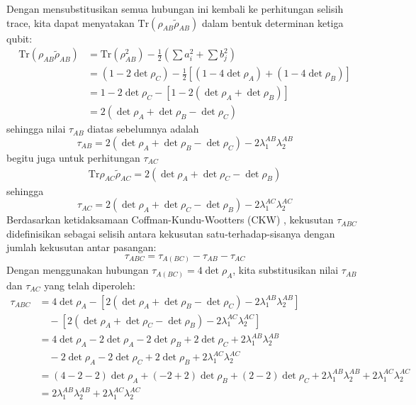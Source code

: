 Dengan mensubstitusikan semua hubungan ini kembali ke perhitungan selisih trace, kita dapat menyatakan $\text{Tr}(\rho_{AB} \tilde{\rho}_{AB})$ dalam bentuk determinan ketiga qubit:
\begin{align*}
	\text{Tr}(\rho_{AB} \tilde{\rho}_{AB}) &= \text{Tr}(\rho_{AB}^2) - \frac{1}{2} \left( \sum a_i^2 + \sum b_j^2 \right) \\
	&= (1 - 2\det \rho_C) - \frac{1}{2} [ (1 - 4\det \rho_A) + (1 - 4\det \rho_B) ] \\
	&= 1 - 2\det \rho_C - [ 1 - 2(\det \rho_A + \det \rho_B) ] \\
	&= 2 ( \det \rho_A + \det \rho_B - \det \rho_C )
\end{align*}
sehingga nilai $\tau_{AB}$ diatas sebelumnya adalah
\begin{equation*}
	\tau_{AB} = 2 ( \det \rho_A + \det \rho_B - \det \rho_C )-2\lambda_1^{AB}\lambda_2^{AB}
\end{equation*}
begitu juga untuk perhitungan $\tau_{AC}$ 
\begin{align*}
	\text{Tr}\rho_{AC}\tilde{\rho}_{AC} = 2( \det \rho_A + \det \rho_C - \det \rho_B)
\end{align*}
sehingga 
\begin{equation*}
	\tau_{AC} = 2( \det \rho_A + \det \rho_C - \det \rho_B) - 2\lambda_1^{AC}\lambda_2^{AC}
\end{equation*}
Berdasarkan ketidaksamaan Coffman-Kundu-Wootters (CKW) \cite{coffman2000distributed}, kekusutan $\tau_{ABC}$ didefinisikan sebagai selisih antara kekusutan satu-terhadap-sisanya dengan jumlah kekusutan antar pasangan:
\begin{equation*}
	\tau_{ABC} = \tau_{A(BC)} - \tau_{AB} - \tau_{AC}
\end{equation*}
Dengan menggunakan hubungan $\tau_{A(BC)} = 4 \det \rho_A$, kita substitusikan nilai $\tau_{AB}$ dan $\tau_{AC}$ yang telah diperoleh:
\begin{align*}
	\tau_{ABC} &= 4 \det \rho_A - \left[ 2 ( \det \rho_A + \det \rho_B - \det \rho_C ) - 2\lambda_1^{AB}\lambda_2^{AB} \right] \\
	&\quad - \left[ 2 ( \det \rho_A + \det \rho_C - \det \rho_B ) - 2\lambda_1^{AC}\lambda_2^{AC} \right] \\
	&= 4 \det \rho_A - 2 \det \rho_A - 2 \det \rho_B + 2 \det \rho_C + 2\lambda_1^{AB}\lambda_2^{AB} \\
	&\quad - 2 \det \rho_A - 2 \det \rho_C + 2 \det \rho_B + 2\lambda_1^{AC}\lambda_2^{AC} \\
	&= (4 - 2 - 2) \det \rho_A + (-2 + 2) \det \rho_B + (2 - 2) \det \rho_C + 2\lambda_1^{AB}\lambda_2^{AB} + 2\lambda_1^{AC}\lambda_2^{AC} \\
	&= 2\lambda_1^{AB}\lambda_2^{AB} + 2\lambda_1^{AC}\lambda_2^{AC}
\end{align*}
